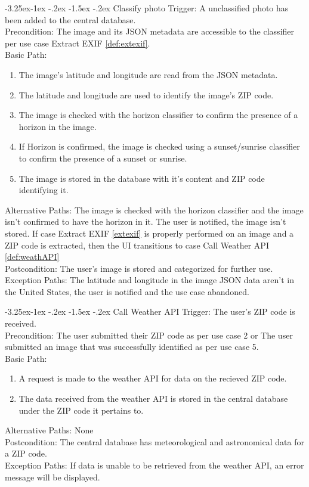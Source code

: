 \documentclass[journal,10pt,draftclsnofoot,onecolumn]{IEEEtran}
\makeatletter
\renewcommand\subsubsection{\@startsection{subsubsection}{3}{\z@}
                                     {-3.25ex\@plus -1ex \@minus -.2ex}
                                     {-1.5ex \@plus -.2ex}
                                     {\normalfont\normalsize\bfseries}}
\makeatother
\begin{document}
\begin{singlespace}
\begin{enumerate}
		\subsubsection{Classify photo} \label{def:classPh}
			Trigger: A unclassified photo has been added to the central database.\\
			Precondition: The image and its JSON metadata are accessible to the classifier per use case Extract EXIF \ref{def:extexif}.\\
			Basic Path:
			\begin{enumerate}
				\item The image's latitude and longitude are read from the JSON metadata.
				\item The latitude and longitude are used to identify the image's ZIP code.
				\item The image is checked with the horizon classifier to confirm the presence of a horizon in the image.
				\item If Horizon is confirmed, the image is checked using a sunset/sunrise classifier to confirm the presence of a sunset or sunrise.
				\item The image is stored in the database with it's content and ZIP code identifying it.
			\end{enumerate}
			Alternative Paths: The image is checked with the horizon classifier and the image isn't confirmed to have the horizon in it. The user is notified, the image isn't stored. If case Extract EXIF \ref{extexif} is properly performed on an image and a ZIP code is extracted, then the UI transitions to case Call Weather API \ref{def:weathAPI}\\
			Postcondition: The user's image is stored and categorized for further use.\\
			Exception Paths: The latitude and longitude in the image JSON data aren't in the United States, the user is notified and the use case abandoned.
		
		\subsubsection{Call Weather API} \label{def:weathAPI}
			Trigger: The user's ZIP code is received.\\
			Precondition: The user submitted their ZIP code as per use case 2 or The user submitted an image that was successfully identified as per use case 5.\\
			Basic Path:
			\begin{enumerate}
				\item A request is made to the weather API for data on the recieved ZIP code.
				\item The data received from the weather API is stored in the central database under the ZIP code it pertains to.
			\end{enumerate}
			Alternative Paths: None\\
			Postcondition: The central database has meteorological and astronomical data for a ZIP code.\\
			Exception Paths: If data is unable to be retrieved from the weather API, an error message will be displayed.
		

\end{enumerate}
\end{singlespace}
\end{document}
